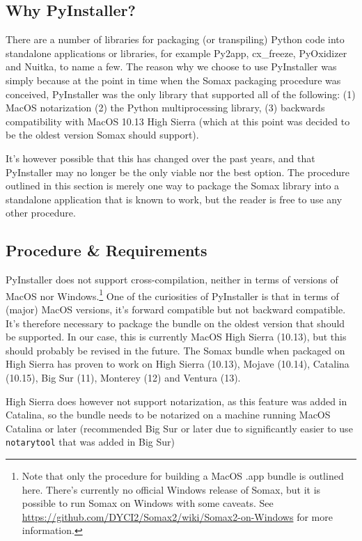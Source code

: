 \subsection{Why PyInstaller?}\label{ssec:2-why-pyinstaller}
There are a number of libraries for packaging (or transpiling) Python code into standalone applications or libraries, for example Py2app, cx\_freeze, PyOxidizer and Nuitka, to name a few. The reason why we choose to use PyInstaller was simply because at the point in time when the Somax packaging procedure was conceived, PyInstaller was the only library that supported all of the following: (1) MacOS notarization (2) the Python multiprocessing library, (3) backwards compatibility with MacOS 10.13 High Sierra (which at this point was decided to be the oldest version Somax should support). 

It's however possible that this has changed over the past years, and that PyInstaller may no longer be the only viable nor the best option. The procedure outlined in this section is merely one way to package the Somax library into a standalone application that is known to work, but the reader is free to use any other procedure.


\subsection{Procedure \& Requirements}\label{ssec:2-pyinstaller-procedure}

PyInstaller does not support cross-compilation, neither in terms of versions of MacOS nor Windows.\footnote{Note that only the procedure for building a MacOS .app bundle is outlined here. There's currently no official Windows release of Somax, but it is possible to run Somax on Windows with some caveats. See \url{https://github.com/DYCI2/Somax2/wiki/Somax2-on-Windows} for more information.} One of the curiosities of PyInstaller is that in terms of (major) MacOS versions, it's forward compatible but not backward compatible. It's therefore necessary to package the bundle on the oldest version that should be supported. In our case, this is currently MacOS High Sierra (10.13), but this should probably be revised in the future. The Somax bundle when packaged on High Sierra has proven to work on High Sierra (10.13), Mojave (10.14), Catalina (10.15), Big Sur (11), Monterey (12) and Ventura (13). 

High Sierra does however not support notarization, as this feature was added in Catalina, so the bundle needs to be notarized on a machine running MacOS Catalina or later (recommended Big Sur or later due to significantly easier to use \texttt{notarytool} that was added in Big Sur)

